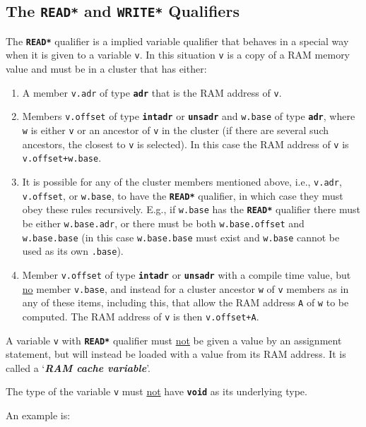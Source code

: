 \documentclass[12pt]{article}
\makeatletter
\newcommand{\TT}[1]{{\tt \bfseries #1}}
\newcommand{\key}[1]{{\bf \em #1}\index{#1}}
\newcommand{\ttakey}[1]{\TT{*#1*}\index{#1@{\tt *#1*}}}
\newcommand{\EOL}{\penalty \exhyphenpenalty}
\makeatother
\begin{document}
\subsection{The \TT{*READ*} and \TT{*WRITE*} Qualifiers}
\label{THE-READ-AND-WRITE-QUALIFIERS}

The \ttakey{READ} qualifier is a implied variable qualifier that behaves
in a special way when it is given to a variable {\tt v}.
In this situation {\tt v} is a copy of a RAM memory value and
must be in a cluster that
has either:
\begin{enumerate}
\item
A member {\tt v.adr} of type \TT{adr} 
that is the RAM address of {\tt v}.

\item
Members {\tt v.offset} of type \TT{intadr} or \TT{unsadr} and
{\tt w.base} of type \TT{adr}, where
{\tt w} is either {\tt v} or an ancestor
of {\tt v} in the cluster (if there are several such ancestors, the
closest to {\tt v} is selected).
In this case the RAM address of {\tt v} is {\tt v.offset+w.base}.

\item
It is possible for any of the cluster members mentioned above,
i.e., {\tt v.adr}, {\tt v.offset}, or {\tt w.base}, to have the
\TT{*READ*} qualifier, in which case they must obey these rules recursively.
E.g., if {\tt w.base} has the \TT{*READ*} qualifier there must be either
{\tt w.base.adr}, or there must be both
{\tt w.base\EOL .offset} and {\tt w.base.base} (in this case
{\tt w.base.base} must exist and {\tt w.base} cannot be used as its
own {\tt .base}).

\item
Member {\tt v.offset} of type \TT{intadr} or \TT{unsadr} with a
compile time value, but \underline{no} member {\tt v.base},
and instead for a cluster ancestor {\tt w} of {\tt v}
members as in any of these items, including this, that allow the RAM
address {\tt A} of {\tt w} to be computed.  The RAM address of {\tt v}
is then {\tt v.offset+A}.
\end{enumerate}

A variable {\tt v} with \TT{*READ*} qualifier
must \underline{not} be given a value by an
assignment statement, but will instead be loaded with a value
from its RAM address.  It is called a `\key{RAM cache variable}'.

The type of the variable {\tt v} must \underline{not} have \TT{void} as its
underlying type.

An example is:
\end{document}
